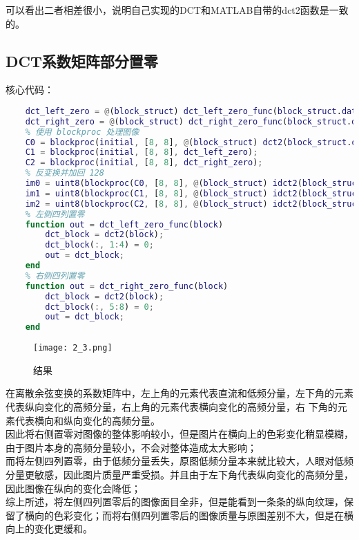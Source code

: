\documentclass[12pt]{article}
\begin{document}
可以看出二者相差很小，说明自己实现的DCT和MATLAB自带的dct2函数是一致的。

\subsection{DCT系数矩阵部分置零}

核心代码：
\begin{lstlisting}[language=matlab]
    % 定义 DCT 处理函数
    dct_left_zero = @(block_struct) dct_left_zero_func(block_struct.data);
    dct_right_zero = @(block_struct) dct_right_zero_func(block_struct.data);
    % 使用 blockproc 处理图像
    C0 = blockproc(initial, [8, 8], @(block_struct) dct2(block_struct.data));
    C1 = blockproc(initial, [8, 8], dct_left_zero);
    C2 = blockproc(initial, [8, 8], dct_right_zero);
    % 反变换并加回 128
    im0 = uint8(blockproc(C0, [8, 8], @(block_struct) idct2(block_struct.data)) + 128);
    im1 = uint8(blockproc(C1, [8, 8], @(block_struct) idct2(block_struct.data)) + 128);
    im2 = uint8(blockproc(C2, [8, 8], @(block_struct) idct2(block_struct.data)) + 128);
    % 左侧四列置零
    function out = dct_left_zero_func(block)
        dct_block = dct2(block);
        dct_block(:, 1:4) = 0;
        out = dct_block;
    end
    % 右侧四列置零
    function out = dct_right_zero_func(block)
        dct_block = dct2(block);
        dct_block(:, 5:8) = 0;
        out = dct_block;
    end
\end{lstlisting}

\begin{figure}[H]
    \centering
    \texttt{[image: 2\_3.png]}
    \caption{结果}
\end{figure}

在离散余弦变换的系数矩阵中，左上角的元素代表直流和低频分量，左下角的元素代表纵向变化的高频分量，右上角的元素代表横向变化的高频分量，右
下角的元素代表横向和纵向变化的高频分量。\\
\hspace*{2em}因此将右侧置零对图像的整体影响较小，但是图片在横向上的色彩变化稍显模糊，由于图片本身的高频分量较小，不会对整体造成太大影响；\\
\hspace*{2em}而将左侧四列置零，由于低频分量丢失，原图低频分量本来就比较大，人眼对低频分量更敏感，因此图片质量严重受损。并且由于左下角代表纵向变化的高频分量，因此图像在纵向的变化会降低；\\
\hspace*{2em}综上所述，将左侧四列置零后的图像面目全非，但是能看到一条条的纵向纹理，保留了横向的色彩变化；而将右侧四列置零后的图像质量与原图差别不大，但是在横向上的变化更缓和。
\end{document}
